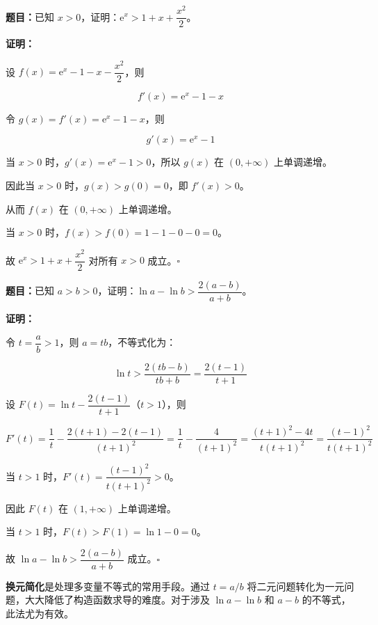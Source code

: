 \documentclass[12pt, a4paper]{ctexart}
\begin{document}
\begin{examplebox}[【例题1】构造函数证明经典不等式]
\textbf{题目：}已知 $x > 0$，证明：$\mathrm{e}^x > 1 + x + \dfrac{x^2}{2}$。

\medskip
\textbf{证明：}

设 $f(x) = \mathrm{e}^x - 1 - x - \dfrac{x^2}{2}$，则

$$f'(x) = \mathrm{e}^x - 1 - x$$

令 $g(x) = f'(x) = \mathrm{e}^x - 1 - x$，则

$$g'(x) = \mathrm{e}^x - 1$$

当 $x > 0$ 时，$g'(x) = \mathrm{e}^x - 1 > 0$，所以 $g(x)$ 在 $(0, +\infty)$ 上单调递增。

因此当 $x > 0$ 时，$g(x) > g(0) = 0$，即 $f'(x) > 0$。

从而 $f(x)$ 在 $(0, +\infty)$ 上单调递增。

当 $x > 0$ 时，$f(x) > f(0) = 1 - 1 - 0 - 0 = 0$。

故 $\mathrm{e}^x > 1 + x + \dfrac{x^2}{2}$ 对所有 $x > 0$ 成立。\hfill$\square$
\end{examplebox}

\begin{examplebox}[【例题2】构造函数证明对数不等式]
\textbf{题目：}已知 $a > b > 0$，证明：$\ln a - \ln b > \dfrac{2(a-b)}{a+b}$。

\medskip
\textbf{证明：}

令 $t = \dfrac{a}{b} > 1$，则 $a = tb$，不等式化为：

$$\ln t > \frac{2(tb - b)}{tb + b} = \frac{2(t-1)}{t+1}$$

设 $F(t) = \ln t - \dfrac{2(t-1)}{t+1}$（$t > 1$），则

$$F'(t) = \frac{1}{t} - \frac{2(t+1) - 2(t-1)}{(t+1)^2} = \frac{1}{t} - \frac{4}{(t+1)^2} = \frac{(t+1)^2 - 4t}{t(t+1)^2} = \frac{(t-1)^2}{t(t+1)^2}$$

当 $t > 1$ 时，$F'(t) = \dfrac{(t-1)^2}{t(t+1)^2} > 0$。

因此 $F(t)$ 在 $(1, +\infty)$ 上单调递增。

当 $t > 1$ 时，$F(t) > F(1) = \ln 1 - 0 = 0$。

故 $\ln a - \ln b > \dfrac{2(a-b)}{a+b}$ 成立。\hfill$\square$
\end{examplebox}

\begin{tipbox}[方法总结]
\textbf{换元简化}是处理多变量不等式的常用手段。通过 $t = a/b$ 将二元问题转化为一元问题，大大降低了构造函数求导的难度。对于涉及 $\ln a - \ln b$ 和 $a - b$ 的不等式，此法尤为有效。
\end{tipbox}
\end{document}
